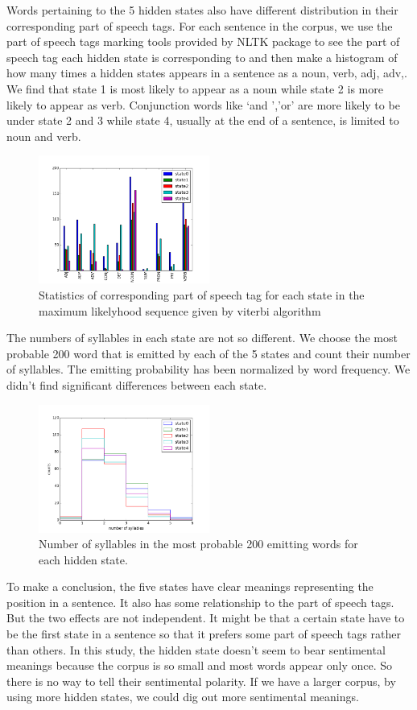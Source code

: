 Words pertaining to the 5 hidden states also have different distribution in their corresponding part of speech tags.  For each sentence in the corpus, we use the part of speech tags marking tools provided by NLTK package to see the part of speech tag each hidden state is corresponding to and then make a histogram of how many times a hidden states appears in a sentence as a noun, verb, adj, adv,. We find that state 1 is most likely to appear as a noun while state 2 is more likely to appear as verb. Conjunction words like ‘and ’,’or’ are more likely to be under state 2 and 3 while state 4, usually at the end of a sentence, is limited to noun and verb.
 \begin{figure}[h!]
 \centering
 \includegraphics[width=0.5\textwidth]{../figure/hiddenstate_partofspeechtag.png}
 \caption{Statistics of corresponding part of speech tag for each state in the maximum likelyhood sequence given by viterbi algorithm}
 \end{figure}

The numbers of syllables in each state are not so different. We choose the most probable 200 word that is emitted by each of the 5 states and count their number of syllables. The emitting probability has been normalized by word frequency. We didn’t find significant differences between each state. 
 \begin{figure}[h!]
 \centering
 \includegraphics[width=0.5\textwidth]{../figure/numberofsyllablesinstates.png}
 \caption{Number of syllables in the most probable 200 emitting words for each hidden state.}
 \end{figure}


To make a conclusion, the five states have clear meanings representing the position in a sentence. It also has some relationship to the part of speech tags. But the two effects are not independent. It might be that a certain state have to be the first state in a sentence so that it prefers some part of speech tags rather than others. In this study, the hidden state doesn't seem to bear sentimental meanings because the corpus is so small and most words appear only once. So there is no way to tell their sentimental polarity. If we have a larger corpus, by using more hidden states, we could dig out more sentimental meanings. 

